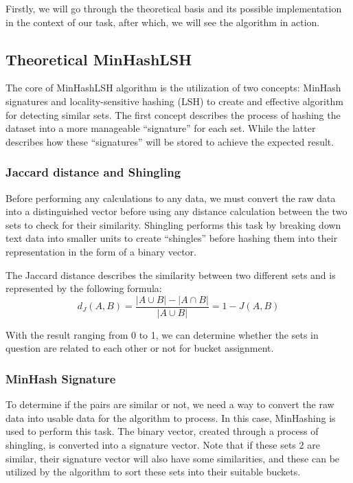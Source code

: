 Firstly, we will go through the theoretical basis and its possible implementation
in the context of our task, after which, we will see the algorithm in action.

\subsection{Theoretical MinHashLSH}
\label{subsec:theoretical-minhashlsh}

The core of MinHashLSH algorithm is the utilization of two concepts: MinHash signatures and locality-sensitive hashing (LSH) to create and effective algorithm for detecting similar sets.
The first concept describes the process of hashing the dataset into a more manageable ``signature'' for each set.
While the latter describes how these ``signatures'' will be stored to achieve the expected result.

\subsubsection{Jaccard distance and Shingling}

Before performing any calculations to any data, we must convert the raw data into a distinguished vector before using any distance calculation between the two sets to check for their similarity.
Shingling performs this task by breaking down text data into smaller units to create ``shingles'' before hashing them into their representation in the form of a binary vector.

The Jaccard distance describes the similarity between two different sets and is represented by the following formula:
\begin{equation}
    \label{eq:equation}
    d_J(A, B) = \frac{|A \cup B| - |A \cap B|}{|A \cup B|} = 1 - J(A, B)
\end{equation}

With the result ranging from 0 to 1, we can determine whether the sets in question are related to each other or not for bucket assignment.

\subsubsection{MinHash Signature}

To determine if the pairs are similar or not, we need a way to convert the raw data into usable data for the algorithm to process.
In this case, MinHashing is used to perform this task.
The binary vector, created through a process of shingling, is converted into a signature vector.
Note that if these sets 2 are similar, their signature vector will also have some similarities, and these can be utilized by the algorithm to sort these sets into their suitable buckets.

